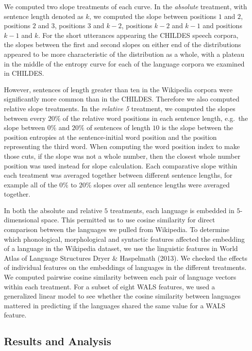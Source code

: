 \documentclass[10pt, letterpaper]{article}
\begin{document}
We computed two slope treatments of each curve. In the \emph{absolute}
treatment, with sentence length denoted as \(k\), we computed the slope
between positions \(1\) and \(2\), positions \(2\) and \(3\), positions
\(3\) and \(k-2\), positions \(k-2\) and \(k-1\) and positions \(k-1\)
and \(k\). For the short utterances appearing the CHILDES speech
corpora, the slopes between the first and second slopes on either end of
the distributions appeared to be more characteristic of the distribution
as a whole, with a plateau in the middle of the entropy curve for each
of the language corpora we examined in CHILDES.

However, sentences of length greater than ten in the Wikipedia corpora
were significantly more common than in the CHILDES. Therefore we also
computed relative slope treatments. In the \emph{relative 5} treatment,
we computed the slopes between every \(20\%\) of the relative word
positions in each sentence length, e.g.~the slope between \(0\%\) and
\(20\%\) of sentences of length \(10\) is the slope between the position
entropies at the sentence-initial word position and the position
representing the third word. When computing the word position index to
make those cuts, if the slope was not a whole number, then the closest
whole number position was used instead for slope calculation. Each
comparative slope within each treatment was averaged together between
different sentence lengths, for example all of the \(0\%\) to \(20\%\)
slopes over all sentence lengths were averaged together.

In both the absolute and relative \(5\) treatments, each language is
embedded in \(5\)-dimensional space. This permitted us to use cosine
similarity for direct comparison between the languages we pulled from
Wikipedia. To determine which phonological, morphological and syntactic
features affected the embedding of a language in the Wikipedia dataset,
we use the linguistic features in World Atlas of Language Structures
Dryer \& Haspelmath (2013). We checked the effects of individual
features on the embeddings of languages in the different treatments. We
computed pairwise cosine similarity between each pair of language
vectors within each treatment. For a subset of eight WALS features, we
used a generalized linear model to see whether the cosine similarity
between languages mattered in predicting if the languages shared the
same value for a WALS feature.

\hypertarget{results-and-analysis-1}{%
\subsection{Results and Analysis}\label{results-and-analysis-1}}
\end{document}
